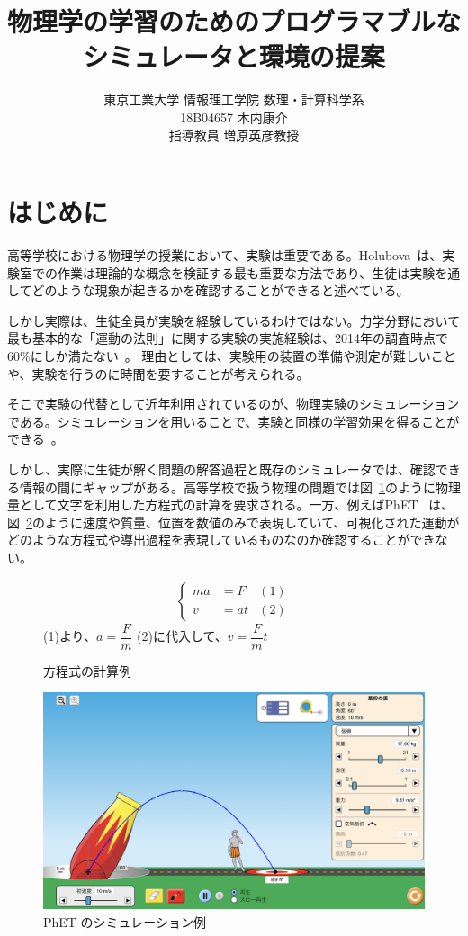 \documentclass[11pt, a4paper, oneside, twocolumn, dvipdfmx]{jsarticle}
\title{物理学の学習のためのプログラマブルな
\\シミュレータと環境の提案}
\author{東京工業大学 情報理工学院 数理・計算科学系\\18B04657 木内康介\\指導教員 増原英彦教授}
\date{}
\begin{document}
\maketitle

\section{はじめに} \label{intro}
高等学校における物理学の授業において、実験は重要である。Holubova~\cite{holubova_2019}は、実験室での作業は理論的な概念を検証する最も重要な方法であり、生徒は実験を通してどのような現象が起きるかを確認することができると述べている。%

しかし実際は、生徒全員が実験を経験しているわけではない。力学分野において最も基本的な「運動の法則」に関する実験の実施経験は、2014年の調査時点で60\%にしか満たない~\cite{2015KJ00010038066}。
理由としては、実験用の装置の準備や測定が難しいことや、実験を行うのに時間を要することが考えられる。

そこで実験の代替として近年利用されているのが、物理実験のシミュレーションである。シミュレーションを用いることで、実験と同様の学習効果を得ることができる~\cite{ajredini_real_2014}。

しかし、実際に生徒が解く問題の解答過程と既存のシミュレータでは、確認できる情報の間にギャップがある。高等学校で扱う物理の問題では図~\ref{symbol_based}のように物理量として文字を利用した方程式の計算を要求される。一方、例えばPhET~\cite{perkins_phet_2006} は、図~\ref{numeral_based}のように速度や質量、位置を数値のみで表現していて、可視化された運動がどのような方程式や導出過程を表現しているものなのか確認することができない。

\begin{figure}[b]
\begin{align}
  \left\{
  \begin{aligned}
    ma &= F & (1)\\
    v &= at & (2)
  \end{aligned}
  \right. \nonumber
\end{align}
(1)より、$a = \dfrac{F}{m}$ \quad (2)に代入して、$v = \dfrac{F}{m}t$
\centering
\caption{方程式の計算例} \label{symbol_based}
\end{figure}

\begin{figure}[thb]
  \centering
  \includegraphics*[width=0.9\linewidth]{figure/PhET_example.png}
  \caption{PhET のシミュレーション例} \label{numeral_based}
  \end{figure}
\end{document}
